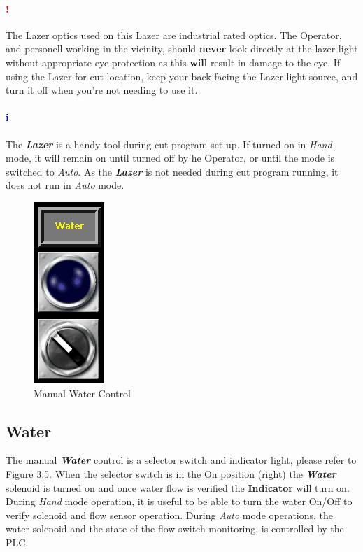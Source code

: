 \paragraph*{\textbf{{\LARGE \textcolor{red}{!}}}} The Lazer optics used on this Lazer are industrial rated optics. The Operator, and personell working in the vicinity, should \textbf{never} look directly at the lazer light without appropriate eye protection as this \textbf{will} result in damage to the eye. If using the Lazer for cut location, keep your back facing the Lazer light source, and turn it off when you're not needing to use it.
\paragraph*{\textbf{\LARGE \textcolor{blue}{i}}} The \textbf{\textit{Lazer}} is a handy tool during cut program set up. If turned on in \textit{Hand} mode, it will remain on until turned off by he Operator, or until the mode is switched to \textit{Auto}. As the \textbf{\textit{Lazer}} is not needed during cut program running, it does not run in \textit{Auto} mode.
\pagebreak
\nopagebreak
\begin{figure}
	\centering
	\includegraphics[width=.2\linewidth]{screen-captures/manual-water}
	\caption{Manual Water Control}
	\label{fig:manual-water}
\end{figure}
\subsection{Water}The manual \textbf{\textit{Water}} control is a selector switch and indicator light, please refer to Figure 3.5. When the selector switch is in the On position (right) the \textbf{\textit{Water}} solenoid is turned on and once water flow is verified the \textbf{Indicator} will turn on. During \textit{Hand} mode operation, it is useful to be able to turn the water On/Off to verify solenoid and flow sensor operation. During \textit{Auto} mode operations, the water solenoid and the state of the flow switch monitoring, is controlled by the PLC.
